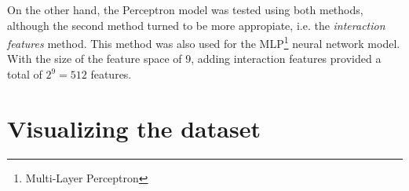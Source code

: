 On the other hand, the Perceptron model was tested using both methods, although the 
second method turned to be more appropiate, i.e. the {\it interaction features} method. 
This method was also used for the MLP\footnote{Multi-Layer Perceptron} neural network 
model. With the size of the feature space of 9, adding interaction features 
provided a total of $2^{9}=512$ features.

\section{Visualizing the dataset}

